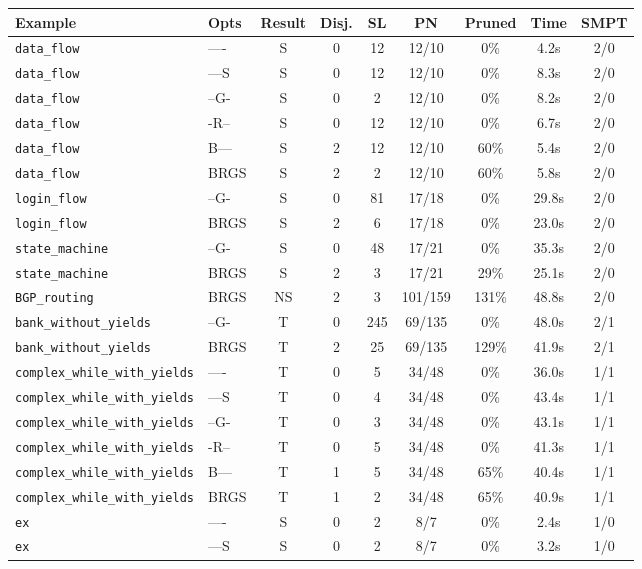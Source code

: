 \begin{tabular}{llccccccc}
\toprule
Example & Opts & Result & Disj. & SL & PN & Pruned & Time & SMPT \\
\midrule
\texttt{data_flow} & ---- & S & 0 & 12 & 12/10 & 0\% & 4.2s & 2/0 \\
\texttt{data_flow} & ---S & S & 0 & 12 & 12/10 & 0\% & 8.3s & 2/0 \\
\texttt{data_flow} & --G- & S & 0 & 2 & 12/10 & 0\% & 8.2s & 2/0 \\
\texttt{data_flow} & -R-- & S & 0 & 12 & 12/10 & 0\% & 6.7s & 2/0 \\
\texttt{data_flow} & B--- & S & 2 & 12 & 12/10 & 60\% & 5.4s & 2/0 \\
\texttt{data_flow} & BRGS & S & 2 & 2 & 12/10 & 60\% & 5.8s & 2/0 \\
\texttt{login_flow} & --G- & S & 0 & 81 & 17/18 & 0\% & 29.8s & 2/0 \\
\texttt{login_flow} & BRGS & S & 2 & 6 & 17/18 & 0\% & 23.0s & 2/0 \\
\texttt{state_machine} & --G- & S & 0 & 48 & 17/21 & 0\% & 35.3s & 2/0 \\
\texttt{state_machine} & BRGS & S & 2 & 3 & 17/21 & 29\% & 25.1s & 2/0 \\
\texttt{BGP_routing} & BRGS & NS & 2 & 3 & 101/159 & 131\% & 48.8s & 2/0 \\
\texttt{bank_without_yields} & --G- & T & 0 & 245 & 69/135 & 0\% & 48.0s & 2/1 \\
\texttt{bank_without_yields} & BRGS & T & 2 & 25 & 69/135 & 129\% & 41.9s & 2/1 \\
\texttt{complex_while_with_yields} & ---- & T & 0 & 5 & 34/48 & 0\% & 36.0s & 1/1 \\
\texttt{complex_while_with_yields} & ---S & T & 0 & 4 & 34/48 & 0\% & 43.4s & 1/1 \\
\texttt{complex_while_with_yields} & --G- & T & 0 & 3 & 34/48 & 0\% & 43.1s & 1/1 \\
\texttt{complex_while_with_yields} & -R-- & T & 0 & 5 & 34/48 & 0\% & 41.3s & 1/1 \\
\texttt{complex_while_with_yields} & B--- & T & 1 & 5 & 34/48 & 65\% & 40.4s & 1/1 \\
\texttt{complex_while_with_yields} & BRGS & T & 1 & 2 & 34/48 & 65\% & 40.9s & 1/1 \\
\texttt{ex} & ---- & S & 0 & 2 & 8/7 & 0\% & 2.4s & 1/0 \\
\texttt{ex} & ---S & S & 0 & 2 & 8/7 & 0\% & 3.2s & 1/0 \\

\end{tabular}
